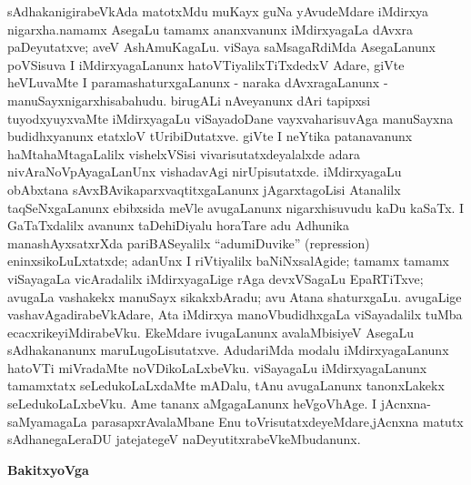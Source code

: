sAdhakanigirabeVkAda matotxMdu muKayx guNa yAvudeMdare iMdirxya nigarxha.\break namamx AsegaLu tamamx ananxvanunx iMdirxyagaLa dAvxra paDeyutatxve; aveV AshAmuKagaLu. viSaya saMsagaRdiMda AsegaLanunx poVSisuva I iMdirxyagaLanunx hatoVTiyalilx\-TiTxdedxV Adare, giVte heVLuvaMte I paramashaturxgaLanunx - naraka dAvxragaLanunx - manuSayx\break nigarxhisabahudu. birugALi nAveyanunx dAri tapipxsi tuyodxyuyxvaMte iMdirxya\-gaLu viSayadoDane vayxvaharisuvAga manuSayxna budidhxyanunx etatxloV tUribiDutatxve. giVte I neYtika patanavanunx haMtahaMtagaLalilx vishelxVSisi vivarisutatxdeyalalxde adara nivAraNoV\-pAyagaLanUnx vishadavAgi nirUpisutatxde. iMdirxyagaLu obAbxtana sAvxBAvika\break  parxvaqtitxgaLanunx jAgarxtagoLisi Atanalilx taqSeNxgaLanunx ebibxsida meVle avugaLanunx nigarxhisu\-vudu kaDu kaSaTx. I GaTaTxdalilx avanunx taDehiDiyalu horaTare adu Adhunika mana\-shAyxsatxrXda pariBASeyalilx ``adumiDuvike'' {\rm (repression)} eninxsikoLuLxtatxde; adanUnx I riVtiyalilx baNiNxsalAgide; tamamx tamamx viSayagaLa vicAradalilx iMdirxyagaLige rAga devxVSagaLu EpaRTiTxve; avugaLa vashakekx manuSayx sikakxbAradu; avu Atana shaturxgaLu. avugaLige vashavAgadirabeVkAdare, Ata iMdirxya manoVbudidhxgaLa viSayadalilx tuMba ecacxrikeyiMdirabeVku. EkeMdare ivugaLanunx avalaMbisiyeV AsegaLu sAdhakananunx maruLugoLisutatxve. AdudariMda modalu iMdirxyagaLanunx hatoVTi miVradaMte noVDikoLaLxbeVku. viSayagaLu iMdirxyagaLanunx tamamxtatx seLedukoLaLxdaMte mADalu, tAnu avugaLanunx tanonxLakekx seLedukoLaLxbeVku. Ame tananx aMgagaLanunx heVgoV\break hAge. I jAcnxna-saMyamagaLa parasapxrAvalaMbane Enu toVrisutatxdeyeMdare,\break jAcnxna matutx sAdhanegaLeraDU jatejategeV naDeyutitxrabeVkeMbudanunx.

\begin{center}
\textbf{\Large{BakitxyoVga}}
\end{center}

